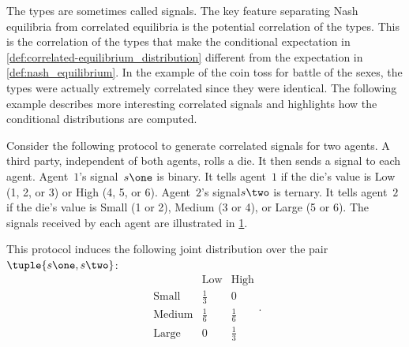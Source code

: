 The types are sometimes called signals.
The key feature separating Nash equilibria from correlated equilibria is the potential correlation of the types.
This is the correlation of the types that make the conditional expectation in \cref{def:correlated-equilibrium_distribution} different from the expectation in \cref{def:nash_equilibrium}.
In the example of the coin toss for battle of the sexes, the types were actually extremely correlated since they were identical.
The following example describes more interesting correlated signals and highlights how the conditional distributions are computed.

\begin{example}

Consider the following protocol to generate correlated signals for two agents.
A third party, independent of both agents, rolls a die.
It then sends a signal to each agent.
Agent~\(1\)'s signal~\(s\one\) is binary.
It tells agent~\(1\) if the die's value is Low (1, 2, or 3) or High (4, 5, or 6).
Agent~\(2\)'s signal\(s\two\) is ternary.
It tells agent~\(2\) if the die's value is Small (1 or 2), Medium (3 or 4), or Large (5 or 6).
The signals received by each agent are illustrated in \cref{fig:bos_correlated_dice}.

\begin{figure}[ht]
\centering
{}
\label{fig:bos_correlated_dice}
\end{figure}

This protocol induces the following joint distribution over the pair~\(\tuple{s\one, s\two}\):
\begin{equation*}
\renewcommand{\arraystretch}{1.5}
\begin{array}{rcc}
                & \mathrm{Low} & \mathrm{High} \\
\mathrm{Small}  & \frac{1}{3}  & 0             \\
\mathrm{Medium} & \frac{1}{6}  & \frac{1}{6}  \\
\mathrm{Large}  & 0            & \frac{1}{3}
\end{array}.
\end{equation*}


\end{example}
